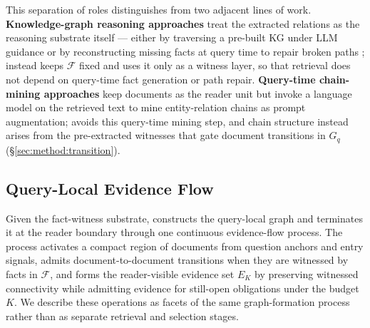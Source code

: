 This separation of roles distinguishes \methodname{} from two adjacent
lines of work. \textbf{Knowledge-graph reasoning approaches}
\citep{sun2024tog,huang2026relink} treat the extracted relations as the
reasoning substrate itself --- either by traversing a pre-built KG under
LLM guidance \citep{sun2024tog} or by reconstructing missing facts at query
time to repair broken paths \citep{huang2026relink}; \methodname{} instead
keeps $\mathcal{F}$ fixed and uses it only as a witness layer, so that
retrieval does not depend on query-time fact generation or path repair.
\textbf{Query-time chain-mining approaches} \citep{peng2026neocorrag} keep
documents as the reader unit but invoke a language model on the retrieved
text to mine entity-relation chains as prompt augmentation; \methodname{}
avoids this query-time mining step, and chain structure instead arises
from the pre-extracted witnesses that gate document transitions in $G_q$
(\S\ref{sec:method:transition}).

\subsection{Query-Local Evidence Flow}
\label{sec:method:flow}

Given the fact-witness substrate, \methodname{} constructs the query-local
graph and terminates it at the reader boundary through one continuous
evidence-flow process. The process activates a compact region of documents
from question anchors and entry signals, admits document-to-document
transitions when they are witnessed by facts in $\mathcal{F}$, and forms
the reader-visible evidence set $E_K$ by preserving witnessed connectivity
while admitting evidence for still-open obligations under the budget $K$.
We describe these operations as facets of the same graph-formation process
rather than as separate retrieval and selection stages.

